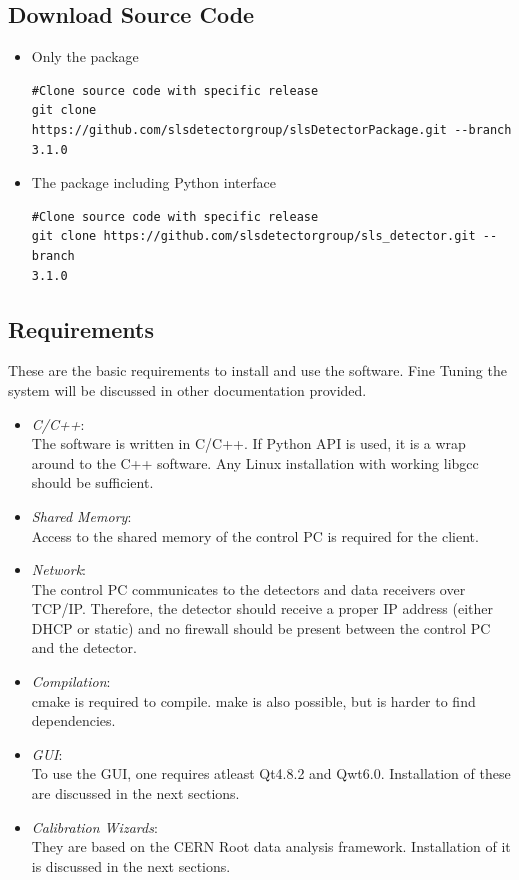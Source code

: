 \documentclass{article}
\begin{document}
\subsection{Download Source Code}

\begin{itemize}
 \item Only the package
\begin{verbatim}
#Clone source code with specific release
git clone https://github.com/slsdetectorgroup/slsDetectorPackage.git --branch
3.1.0
\end{verbatim}
 \item The package including Python interface
\begin{verbatim}
#Clone source code with specific release
git clone https://github.com/slsdetectorgroup/sls_detector.git --branch
3.1.0
\end{verbatim}
\end{itemize}



\subsection{Requirements}
These are the basic requirements to install and use the software. Fine Tuning
the system will be discussed in other documentation provided.
\begin{itemize}

 \item \emph{C/C++}:\\
The software is written in C/C++. If Python API is used, it is a wrap around
to the C++ software.  Any Linux installation with working libgcc should be
sufficient.

 \item \emph{Shared Memory}:\\
Access to the shared memory of the control PC is required for the client.

 \item \emph{Network}:\\
The control PC communicates to the detectors and data receivers over TCP/IP.
Therefore, the detector should receive a proper IP address (either DHCP or
static) and no firewall should be present between the control PC and the
detector.

\item \emph{Compilation}:\\
cmake is required to compile. make is also possible, but is harder to find
dependencies.

\item \emph{GUI}:\\
To use the GUI, one requires atleast Qt4.8.2 and Qwt6.0. Installation of these
are discussed in the next sections.

\item \emph{Calibration Wizards}:\\
They are based on the CERN Root data analysis framework. Installation of it is
discussed in the next sections.

\end{itemize}
\end{document}
